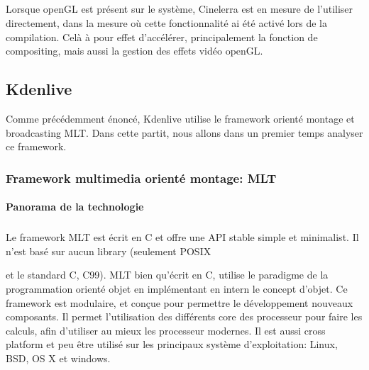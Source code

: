 \subparagraph{}

Lorsque openGL est présent sur le système, Cinelerra
est en mesure de l'utiliser directement, dans la mesure où cette
fonctionnalité ai été activé lors de la compilation. Celà à pour
effet d'accélérer, principalement la fonction de compositing, mais
aussi la gestion des effets vidéo openGL.





\subsection {Kdenlive}

Comme précédemment énoncé, Kdenlive utilise le framework orienté
montage et broadcasting MLT. Dans cette partit, nous allons dans un
premier temps analyser ce framework.

\subsubsection {Framework multimedia orienté montage: MLT}

\paragraph {Panorama de la technologie} %

\subparagraph{}

Le framework MLT est écrit en C et offre une API stable
simple et minimalist. Il n'est basé sur aucun library (seulement POSIX

 et le standard C, C99). MLT bien
qu'écrit en C, utilise le paradigme de la programmation orienté objet en
implémentant en intern le concept d'objet. Ce framework est modulaire,
et conçue pour permettre le développement nouveaux composants. Il
permet l'utilisation des différents core des processeur pour faire
les calculs, afin d'utiliser au mieux les processeur modernes. Il est
aussi cross platform et peu être utilisé sur les principaux système
d'exploitation: Linux, BSD, OS X et windows.

